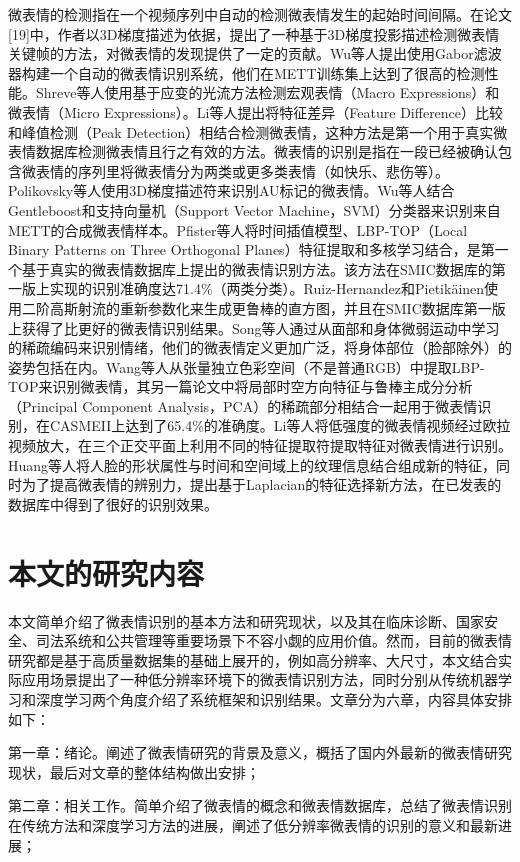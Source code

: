 微表情的检测指在一个视频序列中自动的检测微表情发生的起始时间间隔。在论文[19]中，作者以3D梯度描述为依据，提出了一种基于3D梯度投影描述检测微表情关键帧的方法，对微表情的发现提供了一定的贡献。Wu等人提出使用Gabor滤波器构建一个自动的微表情识别系统，他们在METT训练集上达到了很高的检测性能。Shreve等人使用基于应变的光流方法检测宏观表情（Macro Expressions）和微表情（Micro Expressions）。Li等人提出将特征差异（Feature Difference）比较和峰值检测（Peak Detection）相结合检测微表情，这种方法是第一个用于真实微表情数据库检测微表情且行之有效的方法。微表情的识别是指在一段已经被确认包含微表情的序列里将微表情分为两类或更多类表情（如快乐、悲伤等）。Polikovsky等人使用3D梯度描述符来识别AU标记的微表情。Wu等人结合Gentleboost和支持向量机（Support Vector Machine，SVM）分类器来识别来自METT的合成微表情样本。Pfister等人将时间插值模型、LBP-TOP（Local Binary Patterns on Three Orthogonal Planes）特征提取和多核学习结合，是第一个基于真实的微表情数据库上提出的微表情识别方法。该方法在SMIC数据库的第一版上实现的识别准确度达71.4\%（两类分类）。Ruiz-Hernandez和Pietikäinen使用二阶高斯射流的重新参数化来生成更鲁棒的直方图，并且在SMIC数据库第一版上获得了比更好的微表情识别结果。Song等人通过从面部和身体微弱运动中学习的稀疏编码来识别情绪，他们的微表情定义更加广泛，将身体部位（脸部除外）的姿势包括在内。Wang等人从张量独立色彩空间（不是普通RGB）中提取LBP-TOP来识别微表情，其另一篇论文中将局部时空方向特征与鲁棒主成分分析（Principal Component Analysis，PCA）的稀疏部分相结合一起用于微表情识别，在CASMEII上达到了65.4\%的准确度。Li等人将低强度的微表情视频经过欧拉视频放大，在三个正交平面上利用不同的特征提取符提取特征对微表情进行识别。Huang等人将人脸的形状属性与时间和空间域上的纹理信息结合组成新的特征，同时为了提高微表情的辨别力，提出基于Laplacian的特征选择新方法，在已发表的数据库中得到了很好的识别效果。

\section{本文的研究内容}

本文简单介绍了微表情识别的基本方法和研究现状，以及其在临床诊断、国家安全、司法系统和公共管理等重要场景下不容小觑的应用价值。然而，目前的微表情研究都是基于高质量数据集的基础上展开的，例如高分辨率、大尺寸，本文结合实际应用场景提出了一种低分辨率环境下的微表情识别方法，同时分别从传统机器学习和深度学习两个角度介绍了系统框架和识别结果。文章分为六章，内容具体安排如下：

第一章：绪论。阐述了微表情研究的背景及意义，概括了国内外最新的微表情研究现状，最后对文章的整体结构做出安排；

第二章：相关工作。简单介绍了微表情的概念和微表情数据库，总结了微表情识别在传统方法和深度学习方法的进展，阐述了低分辨率微表情的识别的意义和最新进展；

